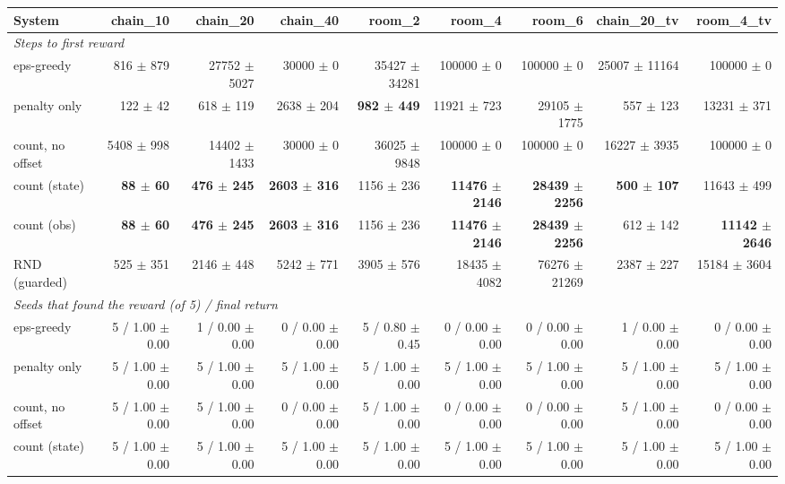 \begin{tabular}{lrrrrrrrr}
\hline
System & chain\_10 & chain\_20 & chain\_40 & room\_2 & room\_4 & room\_6 & chain\_20\_tv & room\_4\_tv \\
\hline
\multicolumn{9}{l}{\emph{Steps to first reward}} \\
eps-greedy & 816 $\pm$ 879 & 27752 $\pm$ 5027 & 30000 $\pm$ 0 & 35427 $\pm$ 34281 & 100000 $\pm$ 0 & 100000 $\pm$ 0 & 25007 $\pm$ 11164 & 100000 $\pm$ 0 \\
penalty only & 122 $\pm$ 42 & 618 $\pm$ 119 & 2638 $\pm$ 204 & \textbf{982 $\pm$ 449} & 11921 $\pm$ 723 & 29105 $\pm$ 1775 & 557 $\pm$ 123 & 13231 $\pm$ 371 \\
count, no offset & 5408 $\pm$ 998 & 14402 $\pm$ 1433 & 30000 $\pm$ 0 & 36025 $\pm$ 9848 & 100000 $\pm$ 0 & 100000 $\pm$ 0 & 16227 $\pm$ 3935 & 100000 $\pm$ 0 \\
count (state) & \textbf{88 $\pm$ 60} & \textbf{476 $\pm$ 245} & \textbf{2603 $\pm$ 316} & 1156 $\pm$ 236 & \textbf{11476 $\pm$ 2146} & \textbf{28439 $\pm$ 2256} & \textbf{500 $\pm$ 107} & 11643 $\pm$ 499 \\
count (obs) & \textbf{88 $\pm$ 60} & \textbf{476 $\pm$ 245} & \textbf{2603 $\pm$ 316} & 1156 $\pm$ 236 & \textbf{11476 $\pm$ 2146} & \textbf{28439 $\pm$ 2256} & 612 $\pm$ 142 & \textbf{11142 $\pm$ 2646} \\
RND (guarded) & 525 $\pm$ 351 & 2146 $\pm$ 448 & 5242 $\pm$ 771 & 3905 $\pm$ 576 & 18435 $\pm$ 4082 & 76276 $\pm$ 21269 & 2387 $\pm$ 227 & 15184 $\pm$ 3604 \\
\hline
\multicolumn{9}{l}{\emph{Seeds that found the reward (of 5) / final return}} \\
eps-greedy & 5 / 1.00 $\pm$ 0.00 & 1 / 0.00 $\pm$ 0.00 & 0 / 0.00 $\pm$ 0.00 & 5 / 0.80 $\pm$ 0.45 & 0 / 0.00 $\pm$ 0.00 & 0 / 0.00 $\pm$ 0.00 & 1 / 0.00 $\pm$ 0.00 & 0 / 0.00 $\pm$ 0.00 \\
penalty only & 5 / 1.00 $\pm$ 0.00 & 5 / 1.00 $\pm$ 0.00 & 5 / 1.00 $\pm$ 0.00 & 5 / 1.00 $\pm$ 0.00 & 5 / 1.00 $\pm$ 0.00 & 5 / 1.00 $\pm$ 0.00 & 5 / 1.00 $\pm$ 0.00 & 5 / 1.00 $\pm$ 0.00 \\
count, no offset & 5 / 1.00 $\pm$ 0.00 & 5 / 1.00 $\pm$ 0.00 & 0 / 0.00 $\pm$ 0.00 & 5 / 1.00 $\pm$ 0.00 & 0 / 0.00 $\pm$ 0.00 & 0 / 0.00 $\pm$ 0.00 & 5 / 1.00 $\pm$ 0.00 & 0 / 0.00 $\pm$ 0.00 \\
count (state) & 5 / 1.00 $\pm$ 0.00 & 5 / 1.00 $\pm$ 0.00 & 5 / 1.00 $\pm$ 0.00 & 5 / 1.00 $\pm$ 0.00 & 5 / 1.00 $\pm$ 0.00 & 5 / 1.00 $\pm$ 0.00 & 5 / 1.00 $\pm$ 0.00 & 5 / 1.00 $\pm$ 0.00 \\

\end{tabular}
